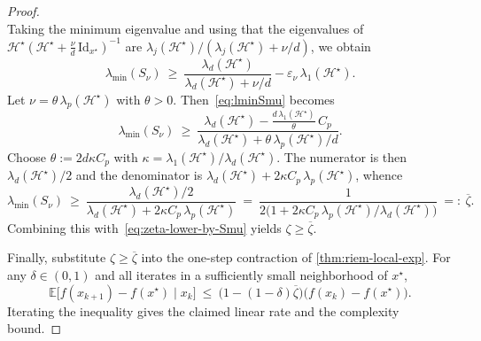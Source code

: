 \documentclass[final,onefignum,onetabnum]{siamart250211}
\begin{document}
\begin{proof}
\[    \]
    Taking the minimum eigenvalue and using that the eigenvalues of $\mathcal{H}^\star(\mathcal{H}^\star+\tfrac{\nu}{d}\,\mathrm{Id}_{x^\star})^{-1}$ are $\lambda_j(\mathcal{H}^\star)/(\lambda_j(\mathcal{H}^\star)+\nu/d)$, we obtain
    \begin{equation}
    \label{eq:lminSmu}
    \lambda_{\min}(S_{\nu})\ \ge\ \frac{\lambda_d(\mathcal{H}^\star)}{\lambda_d(\mathcal{H}^\star)+\nu/d}-\varepsilon_{\nu}\,\lambda_1(\mathcal{H}^\star).
    \end{equation}
    Let $\nu=\theta\,\lambda_p(\mathcal{H}^\star)$ with $\theta>0$. Then~\eqref{eq:lminSmu} becomes
    \[
    \lambda_{\min}(S_{\nu})\ \ge\ \frac{\lambda_d(\mathcal{H}^\star)-\frac{d\,\lambda_1(\mathcal{H}^\star)}{\theta}\,C_p}{\lambda_d(\mathcal{H}^\star)+\theta\,\lambda_p(\mathcal{H}^\star)/d}.
    \]
    Choose $\theta:=2d\kappa C_p$ with $\kappa=\lambda_1(\mathcal{H}^\star)/\lambda_d(\mathcal{H}^\star)$. The numerator is then $\lambda_d(\mathcal{H}^\star)/2$ and the denominator is $\lambda_d(\mathcal{H}^\star)+2\kappa C_p\,\lambda_p(\mathcal{H}^\star)$, whence
    \[
    \lambda_{\min}(S_{\nu})\ \ge\ \frac{\lambda_d(\mathcal{H}^\star)/2}{\lambda_d(\mathcal{H}^\star)+2\kappa C_p\,\lambda_p(\mathcal{H}^\star)}
    \ =\ \frac{1}{2\bigl(1+2\kappa C_p\,\lambda_p(\mathcal{H}^\star)/\lambda_d(\mathcal{H}^\star)\bigr)}\ =:\ \overline{\zeta}.
    \]
    Combining this with~\eqref{eq:zeta-lower-by-Smu} yields $\zeta\ge \overline{\zeta}$.
    
    Finally, substitute $\zeta\ge \overline{\zeta}$ into the one-step contraction of \cref{thm:riem-local-exp}. For any $\delta\in(0,1)$ and all iterates in a sufficiently small neighborhood of $x^\star$,
    \[
    \mathbb E\big[f(x_{k+1})-f(x^\star)\mid x_k\big]\ \le\ \bigl(1-(1-\delta)\overline{\zeta}\bigr)\bigl(f(x_k)-f(x^\star)\bigr).
    \]
    Iterating the inequality gives the claimed linear rate and the complexity bound.
    \end{proof}
        
    




\end{document}
